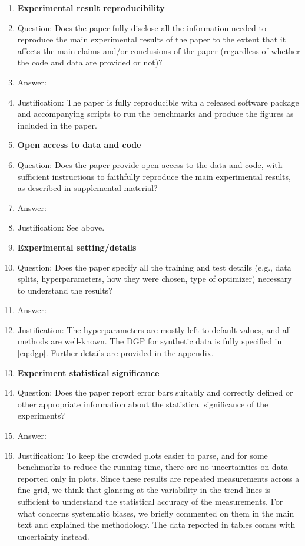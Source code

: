 \begin{enumerate}
	\item {\bf Experimental result reproducibility}
	\item[] Question: Does the paper fully disclose all the information needed to reproduce the main experimental results of the paper to the extent that it affects the main claims and/or conclusions of the paper (regardless of whether the code and data are provided or not)?
	\item[] Answer: \answerYes{} %
	\item[] Justification: The paper is fully reproducible with a released software package and accompanying scripts to run the benchmarks and produce the figures as included in the paper.

	\item {\bf Open access to data and code}
	\item[] Question: Does the paper provide open access to the data and code, with sufficient instructions to faithfully reproduce the main experimental results, as described in supplemental material?
	\item[] Answer: \answerYes{} %
	\item[] Justification: See above.

	\item {\bf Experimental setting/details}
	\item[] Question: Does the paper specify all the training and test details (e.g., data splits, hyperparameters, how they were chosen, type of optimizer) necessary to understand the results?
	\item[] Answer: \answerYes{}
	\item[] Justification: The hyperparameters are mostly left to default
	      values, and all methods are well-known. The DGP for synthetic data is fully
	      specified in \autoref{eq:dgp}.
	      Further details are provided in the appendix.

	\item {\bf Experiment statistical significance}
	\item[] Question: Does the paper report error bars suitably and correctly defined or other appropriate information about the statistical significance of the experiments?
	\item[] Answer: \answerNo{} %
	\item[] Justification: To keep the crowded plots easier to parse, and for
	      some benchmarks to reduce the running time, there are no uncertainties on data reported only in plots.
	      Since these results are repeated measurements across a fine grid, we think
	      that glancing at the variability in the trend lines is sufficient to understand
	      the statistical accuracy of the measurements. For what concerns systematic
	      biases, we briefly commented on them in the main text and explained the
	      methodology. The data reported in tables comes with uncertainty instead.


\end{enumerate}
